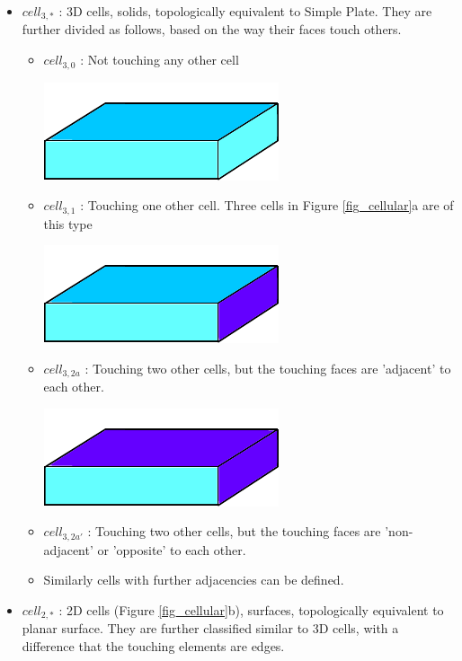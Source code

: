 \begin{itemize}
[noitemsep,topsep=2pt,parsep=2pt,partopsep=2pt,leftmargin=*]
\item $cell_{3,*}$ : 3D cells, solids, topologically equivalent to Simple Plate. They are further divided as follows, based on the way their faces touch others.
	\begin{itemize}
	[noitemsep,topsep=2pt,parsep=2pt,partopsep=2pt,leftmargin=*]
	
	\item $cell_{3,0}$ : Not touching any other cell
	\begin{center}
	\includegraphics[width=0.25\linewidth]{../Common/images/Cell30.pdf} 
	\end{center}
	
	\item $cell_{3,1}$ : Touching one other cell. Three cells in Figure \ref{fig_cellular}a are of this type
	\begin{center}
	\includegraphics[width=0.25\linewidth]{../Common/images/Cell31.pdf} 
	\end{center}
	
	\item $cell_{3,2a}$ : Touching two other cells, but the touching faces are 'adjacent' to each other.
	\begin{center}
	\includegraphics[width=0.25\linewidth]{../Common/images/Cell32a.pdf} 
	\end{center}
	
	\item $cell_{3,2a'}$ : Touching two other cells, but the touching faces are 'non-adjacent' or 'opposite' to each other.
	\item Similarly cells with further adjacencies can be defined.
	\end{itemize}
	
	\item $cell_{2,*}$ : 2D cells (Figure \ref{fig_cellular}b), surfaces, topologically equivalent to planar surface. They are further classified similar to 3D cells, with a difference that the touching elements are edges.

\end{itemize}

